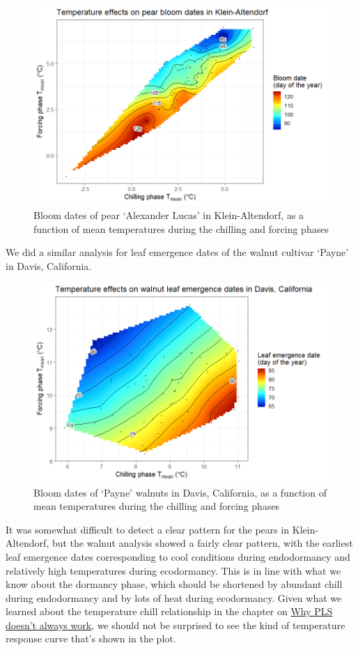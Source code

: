 \documentclass[
]{book}
\begin{document}
\begin{figure}
\centering
\includegraphics{pictures/Rainbow_Alexander_Lucas_CKA.png}
\caption{Bloom dates of pear `Alexander Lucas' in Klein-Altendorf, as a function of mean temperatures during the chilling and forcing phases}
\end{figure}

We did a similar analysis for leaf emergence dates of the walnut cultivar `Payne' in Davis, California.

\begin{figure}
\centering
\includegraphics{pictures/Rainbow_walnuts_Davis.png}
\caption{Bloom dates of `Payne' walnuts in Davis, California, as a function of mean temperatures during the chilling and forcing phases}
\end{figure}

It was somewhat difficult to detect a clear pattern for the pears in Klein-Altendorf, but the walnut analysis showed a fairly clear pattern, with the earliest leaf emergence dates corresponding to cool conditions during endodormancy and relatively high temperatures during ecodormancy. This is in line with what we know about the dormancy phase, which should be shortened by abundant chill during endodormancy and by lots of heat during ecodormancy. Given what we learned about the temperature chill relationship in the chapter on \protect\hyperlink{pls_chillforce_reflection}{Why PLS doesn't always work}, we should not be surprised to see the kind of temperature response curve that's shown in the plot.
\end{document}
